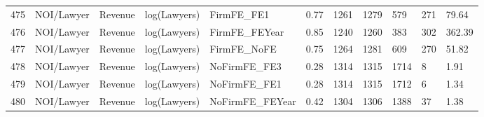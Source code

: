\documentclass{article}
\begin{document}
\begin{table}[H]
\begin{tabular}{rllllllllll}
  475 & NOI/Lawyer & Revenue & log(Lawyers) & FirmFE\_FE1 & 0.77 & 1261 & 1279 & 579 & 271 & 79.64 \\ 
  476 & NOI/Lawyer & Revenue & log(Lawyers) & FirmFE\_FEYear & 0.85 & 1240 & 1260 & 383 & 302 & 362.39 \\ 
  477 & NOI/Lawyer & Revenue & log(Lawyers) & FirmFE\_NoFE & 0.75 & 1264 & 1281 & 609 & 270 & 51.82 \\ 
  478 & NOI/Lawyer & Revenue & log(Lawyers) & NoFirmFE\_FE3 & 0.28 & 1314 & 1315 & 1714 & 8 & 1.91 \\ 
  479 & NOI/Lawyer & Revenue & log(Lawyers) & NoFirmFE\_FE1 & 0.28 & 1314 & 1315 & 1712 & 6 & 1.34 \\ 
  480 & NOI/Lawyer & Revenue & log(Lawyers) & NoFirmFE\_FEYear & 0.42 & 1304 & 1306 & 1388 & 37 & 1.38 \\ 
   \hline
\end{tabular}
\end{table}
\end{document}
